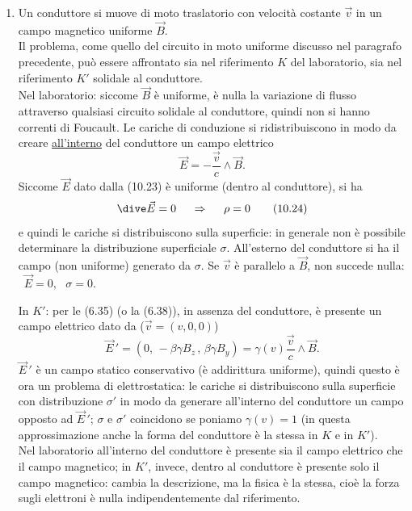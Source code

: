 \begin{enumerate}
  \item Un conduttore si muove di moto traslatorio con velocit\`a costante
    $\vec v$ in un campo magnetico uniforme $\vec B$.\\
    Il problema, come quello del circuito in moto uniforme discusso nel
    paragrafo precedente, pu\`o essere affrontato sia nel riferimento $K$ del
    laboratorio, sia nel riferimento $K'$ solidale al conduttore.\\
    Nel laboratorio: siccome $\vec B$ \`e uniforme, \`e nulla la variazione di
    flusso attraverso qualsiasi circuito solidale al conduttore, quindi non si
    hanno correnti di Foucault. Le cariche di conduzione si ridistribuiscono in
    modo da creare \underline{all'interno} del conduttore un campo elettrico
    \begin{equation}
      \vec E=-\frac{\vec v}{c}\wedge\vec B.
      \tag{10.23}
    \end{equation}
    Siccome $\vec E$ dato dalla (10.23) \`e uniforme (dentro al conduttore), si
    ha
    \begin{equation}
      \dive\vec E=0\quad\ \Rightarrow\quad\ \rho=0
      \tag{10.24}
    \end{equation}
    e quindi le cariche si distribuiscono sulla superficie: in generale non \`e
    possibile determinare la distribuzione superficiale $\sigma$. All'esterno
    del conduttore si ha il
    campo (non uniforme) generato da $\sigma$. Se $\vec v$ \`e parallelo a
    $\vec B$, non succede nulla: \ $\vec E=0$, \ $\sigma=0$.

    In $K'$: per le (6.35) \big(o la (6.38)\big), in assenza del conduttore, \`e
    presente un campo elettrico dato da \big($\vec v=(v,0,0)$\big)
    \begin{equation}
      \vec E\,'=(0,\,-\beta\gamma B_z\,,\,\beta\gamma B_y)
      =\gamma(v)\frac{\vec v}{c}\wedge\vec B.
      \tag{10.25}
    \end{equation}
    $\vec E\,'$ \`e un campo statico conservativo (\`e addirittura uniforme),
    quindi questo \`e ora un problema di elettrostatica: le cariche si
    distribuiscono sulla superficie con distribuzione $\sigma'$ in modo da
    generare all'interno del conduttore un campo opposto ad $\vec E\,'$;
    $\sigma$ e $\sigma'$ coincidono se poniamo $\gamma(v)=1$ (in questa
    approssimazione anche la forma del conduttore \`e la stessa in $K$ e in
    $K'$).\\
    Nel laboratorio all'interno del conduttore \`e presente sia il campo
    elettrico che il campo magnetico; in $K'$, invece, dentro al conduttore \`e
    presente solo il campo magnetico: cambia la descrizione, ma la fisica \`e la
    stessa, cio\`e la forza sugli elettroni \`e nulla indipendentemente dal
    riferimento.
\end{enumerate}

